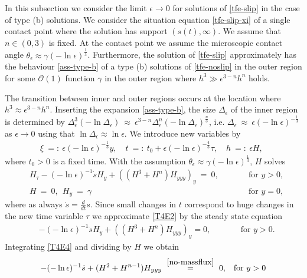 \documentclass[pagesize,pdftex]{amsart}
\newcommand{\OO}{{\mathcal O}}
\newcommand{\gam}{\gamma}
\newcommand{\eps}{\epsilon}
\newcommand{\sig}{\sigma}
\newcommand{\ang}{\theta}
\newcommand{\lupref}[2]{\hspace{0ex} \stackrel{\eqref{#1}}{#2}} %
\begin{document}
In this subsection we consider the limit $\eps \to 0$ for solutions of
\eqref{tfe-slip} in the case of type (b) solutions. We consider the situation
equation \eqref{tfe-slip-xi} of a single contact point where the solution has
support $(s(t), \infty)$. We assume that $n \in (0,3)$ is fixed.  At the contact
point we assume the microscopic contact angle
$\ang_\eps \approx \gam (-\ln \eps)^{\frac 13}$.  Furthermore, the solution of
\eqref{tfe-slip} approximately has the behaviour \eqref{ass-type-b} of a type
(b) solutions of \eqref{tfe-noslip} in the outer region for some $\OO(1)$
function $\gam$ in the outer region where $h^3\gg \eps^{3-n}h^{n}$
holds. 

\medskip

The transition between inner and outer regions occurs at the location where
$h^3 \approx \eps^{3-n}h^{n}$. Inserting the expansion \eqref{ass-type-b}, the
size $\Delta_\eps$ of the inner region is determined by
$\Delta_\eps^3 (- \ln \Delta_\eps) \ %
\approx \ \eps^{3-n}\Delta_\eps^n (-\ln \Delta_\eps)^{\frac{n}{3}}$,
i.e. $\Delta_\eps \ \approx \ \eps (-\ln \eps)^{-\frac 13}$ as $\eps \to 0$
using that $\ln \Delta_\eps \approx \ln \eps$. We introduce new
variables by
  \begin{align}     \label{inner-var-b} %
    \xi \ =: \ \eps (-\ln \eps)^{-\frac 13}y, \quad %
    t \ =: \ t_{0}+ \eps (-\ln \eps)^{-\frac 43}\tau,\quad %
    h \ =: \ \eps H,\  \ %
  \end{align}
  where $t_0 > 0$ is a fixed time. With the assumption
  $\ang_\eps \approx \gam (-\ln \eps)^{\frac 13}$, $H$ solves
\begin{align}
  &H_{\tau }-(-\ln \eps)^{-1}%
  \dot sH_{y}+((H^3+H^{n})H_{yyy})_{y} \ = \ 0, \qquad %
  &&\text{for $y>0$},  \label{T4E2} \\
  &H \ = \ 0,\ \ H_{y} \ = \ \gam \ \ \ %
    &&\text{for $y=0$,}  \label{T4E3-2}
\end{align}
where as always $\dot s = \frac d{dt}s$. Since small changes in $t$ correspond
to huge changes in the new time variable $\tau$ we approximate 
\eqref{T4E2} by the steady state equation
\begin{align}
  &-(-\ln \eps)^{-1}\dot sH_{y}+((H^3+H^{n})H_{yyy})_{y} =0, \qquad %
    &&\text{for $y>0$.}  \label{T4E4}
\end{align}
Integrating \eqref{T4E4}  and dividing by $H$ we obtain%
\begin{align}
  -(-\ln \eps)^{-1}\dot s+(H^2+H^{n-1})H_{yyy} \ \lupref{no-massflux}= \ 0,%
  &&\text{for $y>0$}
  \label{T5E3}
\end{align}
\end{document}
